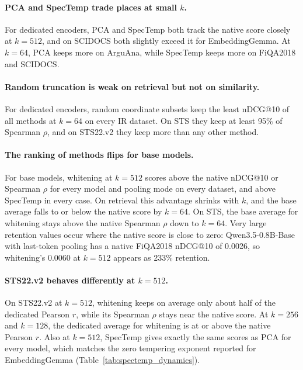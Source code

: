 \paragraph{PCA and SpecTemp trade places at small $k$.}
For dedicated encoders, PCA and SpecTemp both track the native score closely at $k=512$, and on SCIDOCS both slightly exceed it for EmbeddingGemma. At $k=64$, PCA keeps more on ArguAna, while SpecTemp keeps more on FiQA2018 and SCIDOCS.

\paragraph{Random truncation is weak on retrieval but not on similarity.}
For dedicated encoders, random coordinate subsets keep the least nDCG@10 of all methods at $k=64$ on every IR dataset. On STS they keep at least 95\% of Spearman $\rho$, and on STS22.v2 they keep more than any other method.

\paragraph{The ranking of methods flips for base models.}
For base models, whitening at $k=512$ scores above the native nDCG@10 or Spearman $\rho$ for every model and pooling mode on every dataset, and above SpecTemp in every case. On retrieval this advantage shrinks with $k$, and the base average falls to or below the native score by $k=64$. On STS, the base average for whitening stays above the native Spearman $\rho$ down to $k=64$. Very large retention values occur where the native score is close to zero: Qwen3.5-0.8B-Base with last-token pooling has a native FiQA2018 nDCG@10 of 0.0026, so whitening's 0.0060 at $k=512$ appears as 233\% retention.

\paragraph{STS22.v2 behaves differently at $k=512$.}
On STS22.v2 at $k=512$, whitening keeps on average only about half of the dedicated Pearson $r$, while its Spearman $\rho$ stays near the native score. At $k=256$ and $k=128$, the dedicated average for whitening is at or above the native Pearson $r$. Also at $k=512$, SpecTemp gives exactly the same scores as PCA for every model, which matches the zero tempering exponent reported for EmbeddingGemma (Table~\ref{tab:spectemp_dynamics}).
